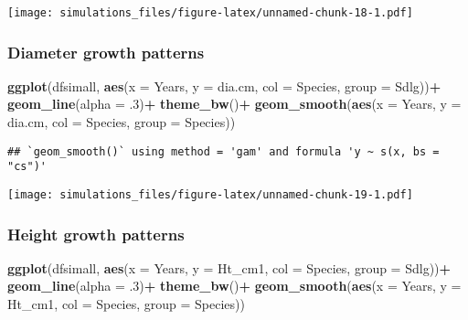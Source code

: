 \documentclass[]{article}
\newenvironment{Shaded}{\begin{snugshade}}{\end{snugshade}}
\newcommand{\KeywordTok}[1]{\textcolor[rgb]{0.13,0.29,0.53}{\textbf{#1}}}
\newcommand{\DataTypeTok}[1]{\textcolor[rgb]{0.13,0.29,0.53}{#1}}
\newcommand{\DecValTok}[1]{\textcolor[rgb]{0.00,0.00,0.81}{#1}}
\newcommand{\StringTok}[1]{\textcolor[rgb]{0.31,0.60,0.02}{#1}}
\newcommand{\OperatorTok}[1]{\textcolor[rgb]{0.81,0.36,0.00}{\textbf{#1}}}
\newcommand{\NormalTok}[1]{#1}
\begin{document}
\texttt{[image: simulations\_files/figure-latex/unnamed-chunk-18-1.pdf]}

\subsubsection{Diameter growth patterns}\label{diameter-growth-patterns}

\begin{Shaded}
\begin{Highlighting}[]
\KeywordTok{ggplot}\NormalTok{(dfsimall, }\KeywordTok{aes}\NormalTok{(}\DataTypeTok{x =}\NormalTok{ Years, }\DataTypeTok{y =}\NormalTok{ dia.cm, }\DataTypeTok{col =}\NormalTok{ Species, }\DataTypeTok{group =}\NormalTok{ Sdlg))}\OperatorTok{+}
\StringTok{  }\KeywordTok{geom_line}\NormalTok{(}\DataTypeTok{alpha =}\NormalTok{ .}\DecValTok{3}\NormalTok{)}\OperatorTok{+}
\StringTok{  }\KeywordTok{theme_bw}\NormalTok{()}\OperatorTok{+}
\StringTok{  }\KeywordTok{geom_smooth}\NormalTok{(}\KeywordTok{aes}\NormalTok{(}\DataTypeTok{x =}\NormalTok{ Years, }\DataTypeTok{y =}\NormalTok{ dia.cm, }\DataTypeTok{col =}\NormalTok{ Species, }\DataTypeTok{group =}\NormalTok{ Species))}
\end{Highlighting}
\end{Shaded}

\begin{verbatim}
## `geom_smooth()` using method = 'gam' and formula 'y ~ s(x, bs = "cs")'
\end{verbatim}

\texttt{[image: simulations\_files/figure-latex/unnamed-chunk-19-1.pdf]}

\subsubsection{Height growth patterns}\label{height-growth-patterns}

\begin{Shaded}
\begin{Highlighting}[]
\KeywordTok{ggplot}\NormalTok{(dfsimall, }\KeywordTok{aes}\NormalTok{(}\DataTypeTok{x =}\NormalTok{ Years, }\DataTypeTok{y =}\NormalTok{ Ht_cm1, }\DataTypeTok{col =}\NormalTok{ Species, }\DataTypeTok{group =}\NormalTok{ Sdlg))}\OperatorTok{+}
\StringTok{  }\KeywordTok{geom_line}\NormalTok{(}\DataTypeTok{alpha =}\NormalTok{ .}\DecValTok{3}\NormalTok{)}\OperatorTok{+}
\StringTok{  }\KeywordTok{theme_bw}\NormalTok{()}\OperatorTok{+}
\StringTok{  }\KeywordTok{geom_smooth}\NormalTok{(}\KeywordTok{aes}\NormalTok{(}\DataTypeTok{x =}\NormalTok{ Years, }\DataTypeTok{y =}\NormalTok{ Ht_cm1, }\DataTypeTok{col =}\NormalTok{ Species, }\DataTypeTok{group =}\NormalTok{ Species))}
\end{Highlighting}
\end{Shaded}
\end{document}
